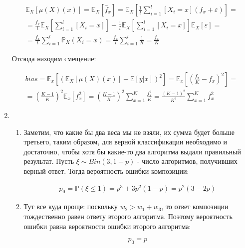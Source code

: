 \documentclass{article}
\begin{document}
\begin{enumerate}
    \begin{gather*}
        \mathbb{E}_X \left[ \mu (X)(x) \right] = \mathbb{E}_X \left[ \hat{f}_x \right] =
        \mathbb{E}_X \left[ \frac{1}{l} \sum_{i=1}^l \left[ X_i = x \right] (f_x + \varepsilon) \right] = \\
        = \frac{f_x}{l} \mathbb{E}_X \left[ \sum_{i=1}^l \left[ X_i = x \right] \right] +
        \frac{1}{l} \mathbb{E}_X \left[ \sum_{i=1}^l \left[ X_i = x \right] \right] \mathbb{E}_X \left[ \varepsilon \right] = \\
        = \frac{f_x}{l} \sum_{i=1}^l \mathbb{P}_X ( X_i = x ) = \frac{f_x}{l} \sum_{i=1}^l \frac{1}{K} = \frac{f_x}{K}
    \end{gather*}

    Отсюда находим смещение:

    \begin{gather*}
        bias = \mathbb{E}_x \left[ {\left( \mathbb{E}_X \left[ \mu (X)(x) \right] - \mathbb{E}\left[ y | x \right] \right) }^2 \right] = 
        \mathbb{E}_x \left[ {\left( \frac{f_x}{K} - f_x \right)}^2 \right] = \\
        = {\left( \frac{K - 1}{K} \right)}^2 \mathbb{E}_x \left[ f_x^2 \right] =
        {\left( \frac{K - 1}{K} \right)}^2 \sum_{x = 1}^K \frac{f_x^2}{K} = \frac{{(K - 1)}^2}{K^3} \sum_{x = 1}^K f_x^2
    \end{gather*}

    \item
    \begin{enumerate}
        \item Заметим, что какие бы два веса мы не взяли, их сумма будет больше третьего, таким образом, для верной классификации
        необходимо и достаточно, чтобы хотя бы какие-то два алгоритма выдали правильный результат. Пусть $ \xi \sim Bin(3, 1 - p) $ - число
        алгоритмов, получивших верный ответ. Тогда вероятность ошибки композиции:

        \begin{gather*}
            p_0 = \mathbb{P} (\xi \le 1) = p^3 + 3 p^2 (1 - p) = p^2 (3 - 2p)
        \end{gather*}

        \item Тут все куда проще: поскольку $ w_2 > w_1 + w_3 $, то ответ композиции тождественно равен ответу второго алгоритма. Поэтому
        вероятность ошибки равна вероятности ошибки второго алгоритма:

        \begin{equation*}
            p_0 = p
        \end{equation*}
    \end{enumerate}
\end{enumerate}
\end{document}
